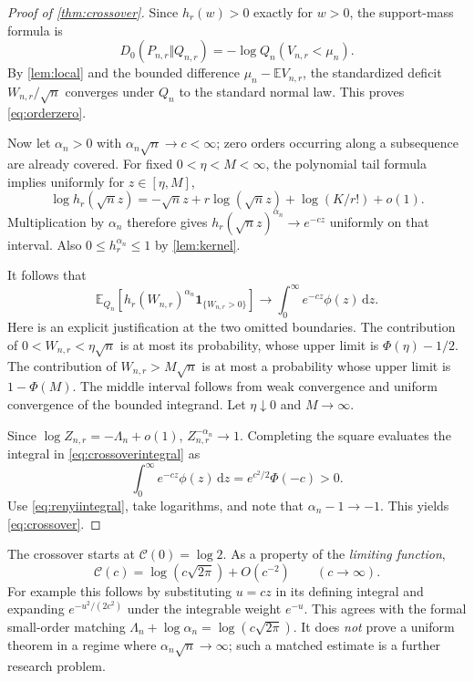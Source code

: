 \documentclass[11pt,oneside]{article}
\numberwithin{equation}{section}
\theoremstyle{plain}
\theoremstyle{definition}
\theoremstyle{remark}
\newcommand{\E}{\mathbb E}
\newcommand{\ind}{\mathbf 1}
\newcommand{\dd}{\,\mathrm d}
\begin{document}
\begin{proof}[Proof of \cref{thm:crossover}]
Since $h_r(w)>0$ exactly for $w>0$, the support-mass formula is
\begin{equation}\label{eq:D0exact}
 D_0(P_{n,r}\Vert Q_{n,r})
   =-\log Q_n(V_{n,r}<\mu_n).
\end{equation}
By \cref{lem:local} and the bounded difference
$\mu_n-\E V_{n,r}$, the standardized deficit $W_{n,r}/\sqrt n$
converges under $Q_n$ to the standard normal law. This proves
\eqref{eq:orderzero}.

Now let $\alpha_n>0$ with $\alpha_n\sqrt n\to c<\infty$; zero
orders occurring along a subsequence are already covered. For fixed
$0<\eta<M<\infty$, the polynomial tail formula implies uniformly
for $z\in[\eta,M]$,
\begin{equation}\label{eq:tailvaryingorder}
 \log h_r(\sqrt n z)
 =-\sqrt n z+r\log(\sqrt n z)+\log(K/r!)+o(1).
\end{equation}
Multiplication by $\alpha_n$ therefore gives
$h_r(\sqrt n z)^{\alpha_n}\to e^{-cz}$ uniformly on that interval.
Also $0\le h_r^{\alpha_n}\le1$ by \cref{lem:kernel}.

It follows that
\begin{equation}\label{eq:crossoverintegral}
 \E_{Q_n}\!
  [h_r(W_{n,r})^{\alpha_n}\ind_{\{W_{n,r}>0\}}]
 \longrightarrow\int_0^\infty e^{-cz}\phi(z)\dd z.
\end{equation}
Here is an explicit justification at the two omitted boundaries.
The contribution of $0<W_{n,r}<\eta\sqrt n$ is at most its
probability, whose upper limit is $\Phi(\eta)-1/2$.
The contribution of $W_{n,r}>M\sqrt n$ is at most a probability
whose upper limit is $1-\Phi(M)$. The middle interval follows
from weak convergence and uniform convergence of the bounded
integrand. Let $\eta\downarrow0$ and $M\to\infty$.

Since $\log Z_{n,r}=-\Lambda_n+o(1)$,
$Z_{n,r}^{-\alpha_n}\to1$. Completing the square evaluates the
integral in \eqref{eq:crossoverintegral} as
\[
 \int_0^\infty e^{-cz}\phi(z)\dd z=e^{c^2/2}\Phi(-c)>0.
\]
Use \eqref{eq:renyiintegral}, take logarithms, and note that
$\alpha_n-1\to-1$. This yields \eqref{eq:crossover}.
\end{proof}

The crossover starts at $\mathcal C(0)=\log2$. As a property of the
\emph{limiting function},
\begin{equation}\label{eq:crossovermatch}
 \mathcal C(c)=\log(c\sqrt{2\pi})+O(c^{-2})\qquad(c\to\infty).
\end{equation}
For example this follows by substituting $u=cz$ in its defining
integral and expanding $e^{-u^2/(2c^2)}$ under the integrable weight
$e^{-u}$. This agrees with the formal small-order matching
$\Lambda_n+\log\alpha_n=\log(c\sqrt{2\pi})$.
It does \emph{not} prove a uniform theorem in a regime where
$\alpha_n\sqrt n\to\infty$; such a matched estimate is a further
research problem.
\end{document}
